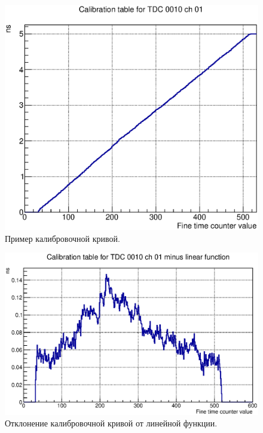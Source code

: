 \begin{figure}
\includegraphics[width=1.0\textwidth]{pictures/Calib_table_example.eps}
\caption{Пример калибровочной кривой.}
\label{fig:TypicalCalibTable}
\end{figure}

\begin{figure}
\includegraphics[width=1.0\textwidth]{pictures/CalibTable_minus_linear_0-600.eps}
\caption{Отклонение калибровочной кривой от линейной функции.}
\label{fig:CalibTableMinusLinear}
\end{figure}

